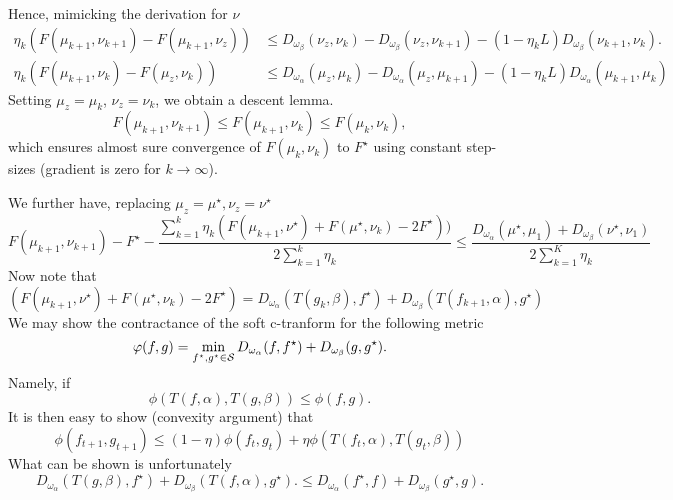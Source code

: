 \documentclass[a4paper, 10pt]{article}
\begin{document}
Hence, mimicking the derivation for $\nu$
\begin{align}
    \eta_k (F(\mu_{k+1},\nu_{k+1}) - F(\mu_{k+1}, \nu_z)) &\leq 
    D_{\omega_\beta}(\nu_z, \nu_k) - D_{\omega_\beta}(\nu_z, \nu_{k+1}) 
    - (1 - \eta_k L) D_{\omega_\beta}(\nu_{k+1}, \nu_k). \\
    \eta_k (F(\mu_{k+1},\nu_k) - F(\mu_z, \nu_k)) &\leq 
    D_{\omega_\alpha}(\mu_z, \mu_k) - D_{\omega_\alpha}(\mu_z, \mu_{k+1}) 
    - (1 - \eta_k L) D_{\omega_\alpha}(\mu_{k+1}, \mu_k)
\end{align}
Setting $\mu_z = \mu_{k}$, $\nu_z = \nu_k$, we obtain a descent lemma.
\begin{equation}
    F(\mu_{k+1}, \nu_{k+1}) \leq F(\mu_{k+1}, \nu_{k}) \leq F(\mu_{k}, \nu_{k}),
\end{equation}
which ensures almost sure convergence of $F(\mu_k, \nu_k)$ to $F^\star$ using constant step-sizes (gradient is zero for $k \to \infty$).

We further have, replacing $\mu_z = \mu^\star, \nu_z = \nu^\star$
%
\begin{equation}
    F(\mu_{k+1}, \nu_{k+1}) - F^\star
    - \frac{
        \sum_{k=1}^k \eta_k (F(\mu_{k+1}, \nu^\star)
    +F(\mu^\star, \nu_k) - 2 F^\star))
    }
    {2 \sum_{k=1}^k \eta_k}
    \leq \frac{
    D_{\omega_\alpha}(\mu^\star, \mu_1)
    + D_{\omega_\beta}(\nu^\star, \nu_1)
    }{2 \sum_{k=1}^K \eta_k}
\end{equation}
Now note that
\begin{equation}
    (F(\mu_{k+1}, \nu^\star)
    +F(\mu^\star, \nu_k) - 2 F^\star) =
     D_{\omega_\alpha}(T(g_k, \beta), f^\star)
     + D_{\omega_\beta}(T(f_{k+1}, \alpha), g^\star)
\end{equation}
We may show the contractance of the soft c-tranform for the following metric
\begin{equation}
    \varphi(f, g) = \min_{f^\star, g^\star \in \mathcal{S}} 
    D_{\omega_\alpha}(f, f^\star)
    +
    D_{\omega_\beta}(g, g^\star).
\end{equation}
Namely, if 
\begin{equation}
    \phi(T(f,\alpha), T(g,\beta))
    \leq \phi(f, g).
\end{equation}
It is then easy to show (convexity argument) that
\begin{equation}
    \phi(f_{t+1}, g_{t+1}) \leq
    (1-\eta) 
    \phi(f_t, g_t)
    + \eta \phi(T(f_t,\alpha), T(g_t,\beta))
\end{equation}
What can be shown is unfortunately
\begin{equation}
    D_{\omega_\alpha}(T(g,\beta), f^\star) +
    D_{\omega_\beta}(T(f,\alpha), g^\star). \leq
    D_{\omega_\alpha}(f^\star, f)
    +
    D_{\omega_\beta}(g^\star, g).
\end{equation}
\end{document}
